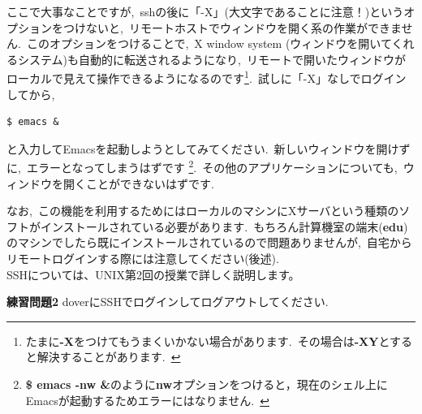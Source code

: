 \documentclass{jarticle}
\begin{document}
ここで大事なことですが,\ sshの後に「-X」(大文字であることに注意！)というオプションをつけないと,\ リモートホストでウィンドウを開く系の作業ができません.\ このオプションをつけることで,\ X window system (ウィンドウを開いてくれるシステム)も自動的に転送されるようになり,\ 
リモートで開いたウィンドウがローカルで見えて操作できるようになるのです\footnote{たまに{\bf -X}をつけてもうまくいかない場合があります.\ 
その場合は{\bf -XY}とすると解決することがあります.\ }.\ 試しに「-X」なしでログインしてから,\ 
\begin{verbatim}
$ emacs &
\end{verbatim}
と入力してEmacsを起動しようとしてみてください.\ 新しいウィンドウを開けずに,\ エラーとなってしまうはずです
\footnote{{\bf \$ emacs -nw \&}のように{\bf nw}オプションをつけると，現在のシェル上にEmacsが起動するためエラーにはなりません.\ }.\ その他のアプリケーションについても,\ ウィンドウを開くことができないはずです.\ 

なお,\ この機能を利用するためにはローカルのマシンにXサーバという種類のソフトがインストールされている必要があります.\ もちろん計算機室の端末({\bf edu})のマシンでしたら既にインストールされているので問題ありませんが,\ 自宅からリモートログインする際には注意してください(後述).\\

SSHについては、UNIX第2回の授業で詳しく説明します。

\vspace{1em}

\begin{itembox}[l]{\textbf{練習問題2}}
doverにSSHでログインしてログアウトしてください.\ 
\end{itembox}


\end{document}
